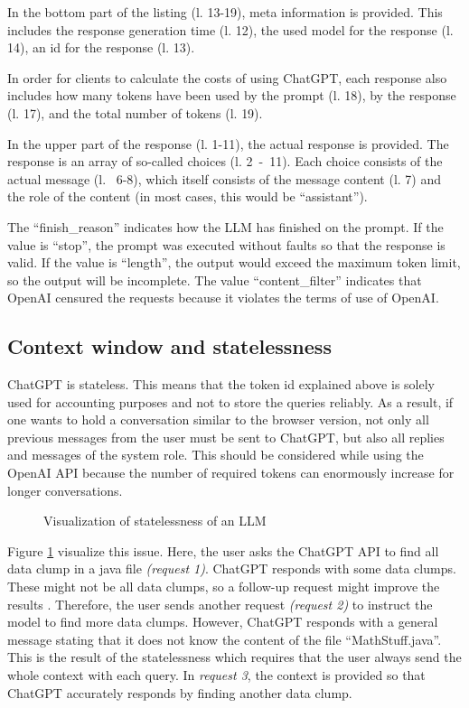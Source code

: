 In the bottom part of the listing (l. 13-19), meta information is provided. This includes the response generation time (l. 12), the used model for the response (l. 14), an id for the response (l. 13).

In order for clients to calculate the costs of using ChatGPT, each response also includes how many tokens have been used by the prompt (l. 18), by the response (l. 17), and the total number of tokens (l. 19).

In the upper part of the response (l. 1-11), the actual response is provided. The response is an array of so-called choices (l. 2~-~11). Each choice consists of the actual message (l.~ 6-8), which itself consists of the message content (l. 7) and the role of the content (in most cases, this would be \enquote{assistant}).

The \enquote{finish\_reason} indicates how the \ac{LLM} has finished on the prompt. If the value is \enquote{stop}, the prompt was executed without faults so that the response is valid. If the value is \enquote{length}, the output would exceed the maximum token limit, so the output will be incomplete. The value \enquote{content\_filter} indicates that OpenAI censured the requests because it violates the terms of use of OpenAI. \cite{ChatGPT_url}
\subsection{Context window and statelessness}

ChatGPT is stateless. This means that the token id explained above is solely used for accounting purposes and not to store the queries reliably. As a result, if one wants to hold a conversation similar to the browser version,  not only all previous messages from the user must be sent to ChatGPT, but also all replies and messages of the system role. This should be considered while using the OpenAI \ac{API} because the number of required tokens can enormously increase for longer conversations.

\begin{figure}
    \centering
    
    \caption{Visualization of statelessness of an \ac{LLM}}
    \label{fig:chatgpt_stateless}
\end{figure}


Figure \ref{fig:chatgpt_stateless} visualize this issue. Here, the user asks the ChatGPT API to find all data clump in a java file \textit{(request 1)}. ChatGPT responds with some data clumps. These might not be all data clumps, so a follow-up request might improve the results \cite{10062688}. Therefore, the user sends another request \textit{(request 2)} to instruct the model to find more data clumps. However, ChatGPT responds with a general message stating that it does not know the content of the file \enquote{MathStuff.java}. This is the result of the statelessness which requires that the user always send the whole context with each query. In \textit{request 3}, the context is provided so that ChatGPT accurately responds by finding another data clump.

